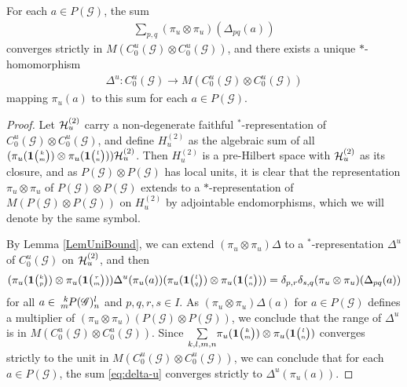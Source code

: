 \begin{Lem}\label{lemma:delta-u}
For each $a \in P(\mathscr{G})$, the sum
\begin{align}\label{eq:delta-u}
   \sum_{p,q} (\pi_{u} \otimes \pi_{u})(\Delta_{pq}(a))
\end{align}
converges strictly in $M(C^{u}_{0}(\mathscr{G}) \otimes C^{u}_{0}(\mathscr{G}))$, and there exists a  unique $*$-homomorphism
\begin{align*}
  \Delta^{u}\colon
  C^{u}_{0}(\mathscr{G}) \to M(C^{u}_{0}(\mathscr{G}) \otimes
  C^{u}_{0}(\mathscr{G}))
\end{align*}
 mapping $\pi_{u}(a)$ to this sum for each $a\in P(\mathscr{G})$.
 \end{Lem}
\begin{proof}
Let $\mathcal{H}_u^{(2)}$ carry a non-degenerate faithful $^*$-representation of $C_0^u(\mathscr{G})\otimes C_0^u(\mathscr{G})$, and define $H_u^{(2)}$ as the algebraic sum of all $(\pi_u(\mathbf{1}{\tiny {\begin{pmatrix} k\\m\end{pmatrix}}}) \otimes \pi_u(\mathbf{1}{\tiny {\begin{pmatrix} l\\n\end{pmatrix}}}))\mathcal{H}_u^{(2)}$. Then $H_u^{(2)}$ is a pre-Hilbert space with $\mathcal{H}_u^{(2)}$ as its closure, and as $P(\mathscr{G})\otimes P(\mathscr{G})$ has local units, it is clear that the representation $\pi_u\otimes \pi_u$ of $P(\mathscr{G})\otimes P(\mathscr{G})$ extends to a $ *$-representation of $M(P(\mathscr{G})\otimes P(\mathscr{G}))$ on $H_u^{(2)}$ by adjointable endomorphisms, which we will denote by the same symbol.

By Lemma \ref{LemUniBound}, we can extend $(\pi_u\otimes \pi_u)\Delta$ to a $^*$-representation $\Delta^u$ of $C_0^u(\mathscr{G})$ on $\mathcal{H}_u^{(2)}$, and
then 
\begin{equation}\label{EqParts}
    (\pi_u(\mathbf{1}{\tiny {\begin{pmatrix} k\\p\end{pmatrix}}}) \otimes
    \pi_u(\mathbf{1}{\tiny {\begin{pmatrix} r\\m\end{pmatrix}}}))\Delta^{u}(\pi_{u}(a))(\pi_u(\mathbf{1}{\tiny {\begin{pmatrix} l\\q\end{pmatrix}}})\otimes \pi_u(\mathbf{1}{\tiny {\begin{pmatrix} s\\n\end{pmatrix}}})) =\delta_{p,r}\delta_{s,q}
    (\pi_{u}  \otimes \pi_{u})(\Delta_{pq}(a))
  \end{equation}
  for all $a \in \Gr{P(\mathscr{G})}{k}{l}{m}{n}$ and $p,q,r,s\in I$.
 As $(\pi_u\otimes \pi_u)\Delta(a)$ for $a\in P(\mathscr{G})$ defines a multiplier of $(\pi_u\otimes \pi_u)(P(\mathscr{G})\otimes P(\mathscr{G}))$, we conclude that the range of $\Delta^u$ is in $M(C_0^u(\mathscr{G})\otimes C_0^u(\mathscr{G}))$.
Since $\underset{k,l,m,n}{\sum} \pi_u(\mathbf{1}{\tiny {\begin{pmatrix} k\\m\end{pmatrix}}})\otimes \pi_u(\mathbf{1}{\tiny {\begin{pmatrix} l\\n\end{pmatrix}}})$ converges strictly to the unit in $M(C_0^u(\mathscr{G})\otimes C_0^u(\mathscr{G}))$, we can conclude that  for each $a\in P(\mathscr{G})$, the sum \eqref{eq:delta-u} converges strictly to $\Delta^{u}(\pi_{u}(a))$.
\end{proof}

